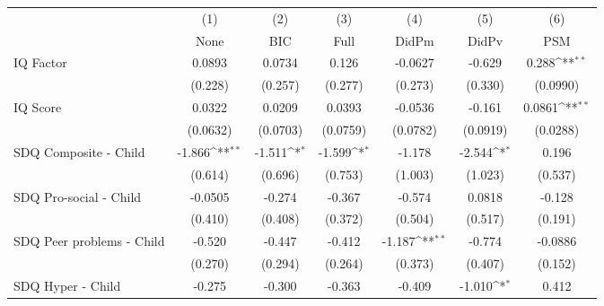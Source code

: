 {
\def\sym#1{\ifmmode^{#1}\else\(^{#1}\)\fi}
\begin{tabular}{l*{6}{c}}
\toprule
            &\multicolumn{1}{c}{(1)}&\multicolumn{1}{c}{(2)}&\multicolumn{1}{c}{(3)}&\multicolumn{1}{c}{(4)}&\multicolumn{1}{c}{(5)}&\multicolumn{1}{c}{(6)}\\
            &\multicolumn{1}{c}{None}&\multicolumn{1}{c}{BIC}&\multicolumn{1}{c}{Full}&\multicolumn{1}{c}{DidPm}&\multicolumn{1}{c}{DidPv}&\multicolumn{1}{c}{PSM}\\
\midrule
IQ Factor   &      0.0893         &      0.0734         &       0.126         &     -0.0627         &      -0.629         &       0.288\sym{**} \\
            &     (0.228)         &     (0.257)         &     (0.277)         &     (0.273)         &     (0.330)         &    (0.0990)         \\
\addlinespace
IQ Score    &      0.0322         &      0.0209         &      0.0393         &     -0.0536         &      -0.161         &      0.0861\sym{**} \\
            &    (0.0632)         &    (0.0703)         &    (0.0759)         &    (0.0782)         &    (0.0919)         &    (0.0288)         \\
\addlinespace
SDQ Composite - Child&      -1.866\sym{**} &      -1.511\sym{*}  &      -1.599\sym{*}  &      -1.178         &      -2.544\sym{*}  &       0.196         \\
            &     (0.614)         &     (0.696)         &     (0.753)         &     (1.003)         &     (1.023)         &     (0.537)         \\
\addlinespace
SDQ Pro-social - Child&     -0.0505         &      -0.274         &      -0.367         &      -0.574         &      0.0818         &      -0.128         \\
            &     (0.410)         &     (0.408)         &     (0.372)         &     (0.504)         &     (0.517)         &     (0.191)         \\
\addlinespace
SDQ Peer problems - Child&      -0.520         &      -0.447         &      -0.412         &      -1.187\sym{**} &      -0.774         &     -0.0886         \\
            &     (0.270)         &     (0.294)         &     (0.264)         &     (0.373)         &     (0.407)         &     (0.152)         \\
\addlinespace
SDQ Hyper - Child&      -0.275         &      -0.300         &      -0.363         &      -0.409         &      -1.010\sym{*}  &       0.412         \\

\end{tabular}}
